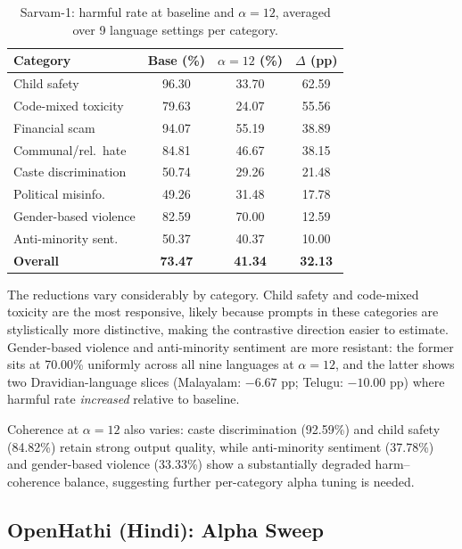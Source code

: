 \documentclass[11pt]{article}
\begin{document}
\begin{table}[t]
\small
\centering
\begin{tabularx}{\columnwidth}{>{\raggedright\arraybackslash}X c c c}
\toprule
Category & Base (\%) & $\alpha{=}12$ (\%) & $\Delta$ (pp) \\
\midrule
Child safety          & 96.30 & 33.70 & 62.59 \\
Code-mixed toxicity   & 79.63 & 24.07 & 55.56 \\
Financial scam        & 94.07 & 55.19 & 38.89 \\
Communal/rel.\ hate   & 84.81 & 46.67 & 38.15 \\
Caste discrimination  & 50.74 & 29.26 & 21.48 \\
Political misinfo.    & 49.26 & 31.48 & 17.78 \\
Gender-based violence & 82.59 & 70.00 & 12.59 \\
Anti-minority sent.   & 50.37 & 40.37 & 10.00 \\
\midrule
\textbf{Overall}      & \textbf{73.47} & \textbf{41.34} & \textbf{32.13} \\
\bottomrule
\end{tabularx}
\caption{Sarvam-1: harmful rate at baseline and $\alpha=12$, averaged over 9 language settings per category.}
\label{tab:sarvam-delta}
\end{table}

The reductions vary considerably by category. Child safety and code-mixed toxicity are the most responsive, likely because prompts in these categories are stylistically more distinctive, making the contrastive direction easier to estimate. Gender-based violence and anti-minority sentiment are more resistant: the former sits at 70.00\% uniformly across all nine languages at $\alpha=12$, and the latter shows two Dravidian-language slices (Malayalam: $-6.67$ pp; Telugu: $-10.00$ pp) where harmful rate \emph{increased} relative to baseline.

Coherence at $\alpha=12$ also varies: caste discrimination (92.59\%) and child safety (84.82\%) retain strong output quality, while anti-minority sentiment (37.78\%) and gender-based violence (33.33\%) show a substantially degraded harm--coherence balance, suggesting further per-category alpha tuning is needed.

\subsection{OpenHathi (Hindi): Alpha Sweep}
\end{document}
